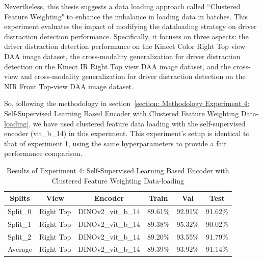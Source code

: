 Nevertheless, this thesis suggests a data loading approach called ``Clustered Feature Weighting" to enhance the imbalance in loading data in batches. This experiment evaluates the impact of modifying the dataloading strategy on driver distraction detection performance. Specifically, it focuses on three aspects: the driver distraction detection performance on the Kinect Color Right Top view DAA image dataset, the cross-modality generalization for driver distraction detection on the Kinect IR Right Top view DAA image dataset, and the cross-view and cross-modality generalization for driver distraction detection on the NIR Front Top-view DAA image dataset.

So, following the methodology in section~\ref{section: Methodology Experiment 4: Self-Supervised Learning Based Encoder with Clustered Feature Weighting Data-loading}, we have used clustered feature data loading with the self-supervised encoder (vit\_b\_14) in this experiment. This experiment's setup is identical to that of experiment 1, using the same hyperparameters to provide a fair performance comparison.
\begin{table}[htbp]
\caption{Results of Experiment 4: Self-Supervised Learning Based Encoder with Clustered Feature Weighting Data-loading}
\label{table:experiment 4 results}
\centering
\begin{tabular}{llllll}
\multicolumn{1}{c}{\textbf{Splits}} & \multicolumn{1}{c}{\textbf{View}} & \multicolumn{1}{c}{\textbf{Encoder}} & \multicolumn{1}{c}{\textbf{Train}} & \multicolumn{1}{c}{\textbf{Val}} & \multicolumn{1}{c}{\textbf{Test}}\\
\hline
Split\_0 & Right Top & DINOv2\_vit\_b\_14 & 89.61\% & 92.91\% & 91.62\% \\
Split\_1 & Right Top & DINOv2\_vit\_b\_14 & 89.38\% & 95.32\% & 90.02\% \\
Split\_2 & Right Top & DINOv2\_vit\_b\_14 & 89.20\% & 93.55\% & 91.79\% \\
\hline
Average & Right Top & DINOv2\_vit\_b\_14 & 89.39\% & 93.92\% & 91.14\% \\
\hline
\end{tabular}
\end{table}

